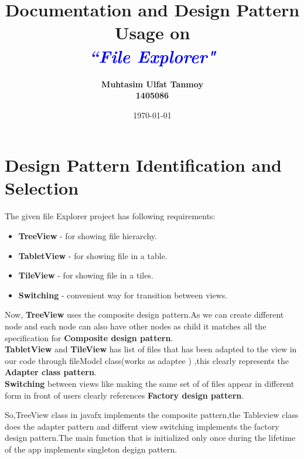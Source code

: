 \documentclass[10pt]{article}
\newcommand{\blueIt}[1]{\itshape \textcolor{blue}{#1}}
\begin{document}
\title{\bfseries \Huge Documentation and Design Pattern Usage on\\
\blueIt{``File Explorer"}}

\author{\bfseries Muhtasim Ulfat Tanmoy\\
1405086}
\date{\today}

\maketitle


\newpage

\section {Design Pattern Identification and Selection}

The given file Explorer project has following requirements:

\begin{itemize} %
 \item {\bfseries TreeView } - for showing file hierarchy.
 \item {\bfseries TabletView } - for showing file in a table.
  \item {\bfseries TileView } - for showing file in a tiles.
  \item {\bfseries Switching } - convenient way for transition between views.
 \end{itemize}
 
 Now, {\bfseries TreeView } uses the composite design pattern.As we can create different node and each node can also have other nodes as child it matches all the specification for {\bfseries Composite design pattern}.\\
 
 {\bfseries TabletView } and {\bfseries TileView }  has list of files that has been adapted to the view in our code through fileModel class(works as adaptee ) ,this clearly represents the {\bfseries Adapter class pattern}.\\
 
 
 
 {\bfseries Switching } between views like making the same set of of files appear in different form in front of users clearly references {\bfseries Factory design pattern}.
 
 
 So,TreeView class in javafx implements the composite pattern,the Tableview class does the adapter pattern and differnt view switching implements the factory design pattern.The main function that is initialized only once during the lifetime of the app implements singleton degign pattern.\\
 
\end{document}
